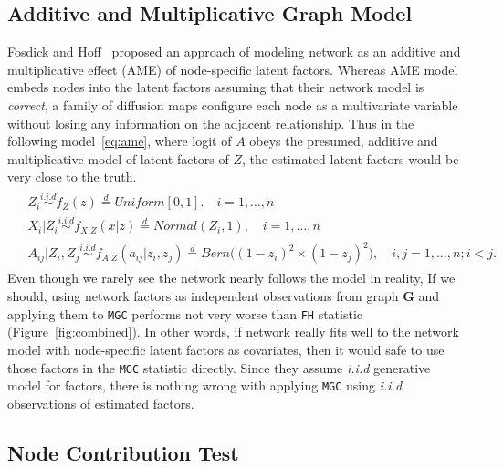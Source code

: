 \documentclass[11pt]{article}
\theoremstyle{definition}
\begin{document}
\subsection{Additive and Multiplicative Graph Model}
\label{ssec:ame}

Fosdick and Hoff~\cite{fosdick2015testing} proposed an approach of modeling network as an additive and multiplicative effect (AME) of node-specific latent factors. Whereas AME model embeds nodes into the latent factors assuming that their network model is \textit{correct}, a family of diffusion maps configure each node as a multivariate variable without losing any information on the adjacent relationship. Thus in the following model~\ref{eq:ame}, where logit of $A$ obeys the presumed, additive and multiplicative model of latent factors of $Z$, the estimated latent factors would be very close to the truth. 
\begin{equation}
\label{eq:ame}
\begin{gathered}
\begin{aligned}
&	Z_{i} \overset{i.i.d}{\sim} f_{Z}(z) \stackrel{d}{=} Uniform[0,1]. \quad i = 1, \ldots, n \\ 
&	X_{i} | Z_{i} \overset{i.i.d}{\sim}  f_{X|Z}(x|z) \stackrel{d}{=}  Normal(Z_{i}, 1), \quad i= 1, \ldots, n \\
&	A_{ij} | Z_{i}, Z_{j} \overset{i.i.d}{\sim}  f_{A|Z}(a_{ij} | z_{i}, z_{j}) \stackrel{d}{=}   Bern \big(  ( 1 - z_{i})^2 \times (1 - z_{j})^2    \big), \quad i,j = 1, \ldots, n; i < j.
\end{aligned}
\end{gathered}
\end{equation}	
Even though we rarely see the network nearly follows the model in reality, If we should, using network factors as independent observations from graph \textbf{G} and applying them to \texttt{MGC} performs not very worse than \texttt{FH} statistic (Figure~\ref{fig:combined}). In other words, if network really fits well to the network model with node-specific latent factors as covariates, then it would safe to use those factors in the \texttt{MGC} statistic directly. Since they assume \textit{i.i.d} generative model for factors, there is nothing wrong with applying \texttt{MGC} using \textit{i.i.d} observations of estimated factors.

\subsection{Node Contribution Test}
\label{ssec:node}
\end{document}
